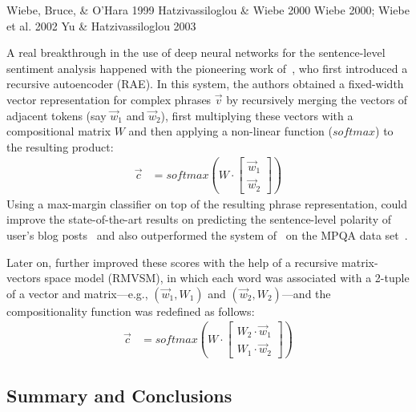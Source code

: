 \citet{Mohammad:13}

\citet{Kobayashi:07}
Wiebe, Bruce, \& O'Hara 1999
Hatzivassiloglou \& Wiebe 2000
Wiebe 2000; Wiebe et al. 2002
Yu \& Hatzivassiloglou 2003


\citet{Yessenalina:11}

A real breakthrough in the use of deep neural networks for the
sentence-level sentiment analysis happened with the pioneering work
of~\citet{Socher:11}, who first introduced a recursive autoencoder
(RAE).  In this system, the authors obtained a fixed-width vector
representation for complex phrases $\vec{v}$ by recursively merging
the vectors of adjacent tokens (say $\vec{w}_1$ and $\vec{w}_2$),
first multiplying these vectors with a compositional matrix $W$ and
then applying a non-linear function ($softmax$) to the resulting
product:
\begin{align*}
  \vec{c} &= softmax\left(W\cdot\begin{bmatrix}
  \vec{w}_1\\
  \vec{w}_2
  \end{bmatrix}\right)
\end{align*}
Using a max-margin classifier on top of the resulting phrase
representation, \citet{Socher:11} could improve the state-of-the-art
results on predicting the sentence-level polarity of user's blog
posts~\cite{Potts:10} and also outperformed the system
of~\citet{Nasukawa:03} on the MPQA data set~\cite{Wiebe:05}.

Later on, \citet{Socher:12} further improved these scores with the
help of a recursive matrix-vectors space model (RMVSM), in which each
word was associated with a 2-tuple of a vector and matrix---e.g.,
$(\vec{w}_1, W_1)$ and $(\vec{w}_2, W_2)$---and the compositionality
function was redefined as follows:
\begin{align*}
  \vec{c} &= softmax\left(W\cdot\begin{bmatrix}
  W_2\cdot\vec{w}_1\\
  W_1\cdot\vec{w}_2
  \end{bmatrix}\right)
\end{align*}

\citet{Wang:15}

\subsection{Summary and Conclusions}\label{slsa:subsec:conclusions}
